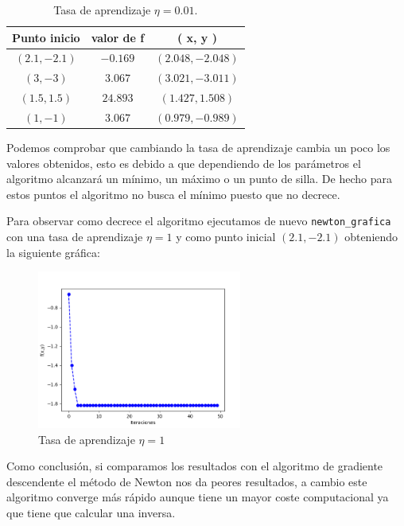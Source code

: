 \documentclass[size=a4, parskip=half, titlepage=false, toc=flat, toc=bib, 12pt]{scrartcl}
\begin{document}
\begin{table}[H]
\centering
{}
\begin{tabular}{ccc}
\hline
{\color[HTML]{000000} Punto inicio}   & {\color[HTML]{000000} valor de f} & {\color[HTML]{000000} ( x, y )}          \\ \hline
{\color[HTML]{000000} $(2.1 , -2.1)$} & {\color[HTML]{000000} $-0.169$}     & {\color[HTML]{000000} $(2.048, -2.048)$} \\ \hline
{\color[HTML]{000000} $(3, -3)$}      & {\color[HTML]{000000} $3.067$}      & {\color[HTML]{000000} $(3.021, -3.011)$} \\ \hline
{\color[HTML]{000000} $(1.5, 1.5)$}   & {\color[HTML]{000000} $24.893$}     & {\color[HTML]{000000} $(1.427, 1.508)$}  \\ \hline
{\color[HTML]{000000} $(1, -1)$}      & {\color[HTML]{000000} $3.067$}      & {\color[HTML]{000000} $(0.979, -0.989)$} \\ \hline
\end{tabular}
\caption{Tasa de aprendizaje $\eta = 0.01$.}
\end{table}

Podemos comprobar que cambiando la tasa de aprendizaje cambia un poco los valores obtenidos, esto es debido
a que dependiendo de los parámetros el algoritmo alcanzará un mínimo, un máximo o un punto de silla. De hecho para
estos puntos el algoritmo no busca el mínimo puesto que no decrece.

Para observar como decrece el algoritmo ejecutamos de nuevo \verb|newton_grafica| con una tasa
de aprendizaje $\eta = 1$ y como punto inicial $(2.1, -2.1)$ obteniendo la siguiente gráfica:

\begin{figure}[H]
\centering
\includegraphics[width=0.6\textwidth]{./img/bonus24}
\caption{Tasa de aprendizaje $\eta = 1$}
\end{figure}


Como conclusión, si comparamos los resultados con el algoritmo de gradiente descendente el método de Newton nos da peores resultados,
a cambio este algoritmo converge más rápido aunque tiene un mayor coste computacional ya que tiene que calcular una inversa.

\end{document}

